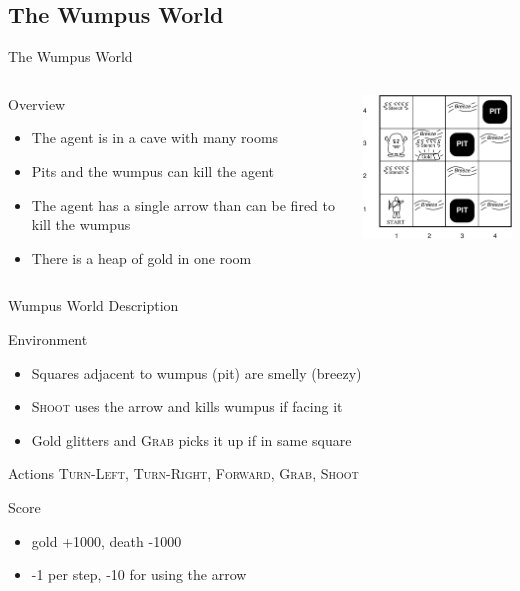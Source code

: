 \documentclass[14pt]{beamer}
\begin{document}
\subsection{The Wumpus World}
\begin{frame}{The Wumpus World}
	\begin{columns}
		\begin{column}{2in}
			\begin{block}{Overview}
				\begin{itemize}
					\item The agent is in a cave with many rooms
					\item Pits and the wumpus can kill the agent
					\item The agent has a single arrow than can be fired to kill the wumpus
					\item There is a heap of gold in one room
				\end{itemize}
			\end{block}
		\end{column}
		\begin{column}{2in}
			\includegraphics[width=2in]{wumpus-world}
		\end{column}
	\end{columns}
\end{frame}
\begin{frame}{Wumpus World Description}
	\begin{block}{Environment}
		\begin{itemize}
			\item Squares adjacent to wumpus (pit) are smelly (breezy)
			\item \textsc{Shoot} uses the arrow and kills wumpus if facing it
			\item Gold glitters and \textsc{Grab} picks it up if in same square
		\end{itemize}
	\end{block}
	\pause
	\begin{block}{Actions}
		\textsc{Turn-Left}, \textsc{Turn-Right}, \textsc{Forward}, \textsc{Grab}, \textsc{Shoot}
	\end{block}
	\pause
	\begin{block}{Score}
		\begin{itemize}
			\item gold +1000, death -1000
			\item -1 per step, -10 for using the arrow
		\end{itemize}
	\end{block}
\end{frame}
\end{document}
